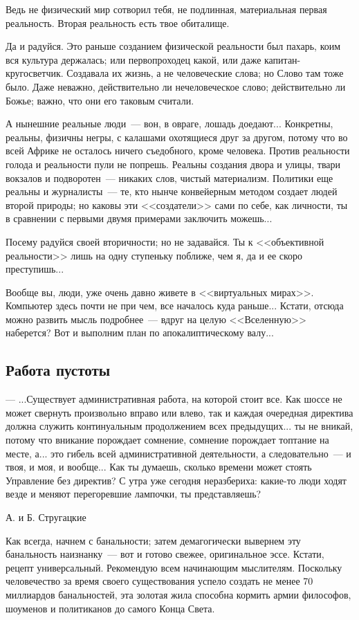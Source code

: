 \documentclass{scrbook}
\makeatletter
\newcommand{\bigepigraphwidth}{0.8} %
\newcommand{\defaultepigraphwidth}{0.5} %
\newcommand{\flqq}{<<}
\newcommand{\frqq}{>>}
\newcommand{\mdash}{~--- }
\newcommand{\sdash}{--- } %
\newcommand{\essaysection}[1]{\subsection*{#1}\nopagebreak}
\newcommand{\myepigraph}[3][\@empty]{
	\ifx\@empty#1
		\setlength{\epigraphwidth}{\defaultepigraphwidth\textwidth}
	\else
		\setlength{\epigraphwidth}{#1\textwidth}
	\fi
	\epigraph{#2}{#3}
	\setlength{\epigraphwidth}{\defaultepigraphwidth\textwidth} %
	\nopagebreak
}
\makeatother
\begin{document}
Ведь не физический мир сотворил тебя, не подлинная, материальная первая реальность. Вторая реальность есть твое обиталище.

Да и радуйся. Это раньше созданием физической реальности был пахарь, коим вся культура держалась; или первопроходец какой, или даже капитан-кругосветчик. Создавала их жизнь, а не человеческие слова; но Слово там тоже было. Даже неважно, действительно ли нечеловеческое слово; действительно ли Божье; важно, что они его таковым считали.

А нынешние реальные люди{\mdash}вон, в овраге, лошадь доедают... Конкретны, реальны, физичны негры, с калашами охотящиеся друг за другом, потому что во всей Африке не осталось ничего съедобного, кроме человека. Против реальности голода и реальности пули не попрешь. Реальны создания двора и улицы, твари вокзалов и подворотен{\mdash}никаких слов, чистый материализм. Политики еще реальны и журналисты{\mdash}те, кто нынче конвейерным методом создает людей второй природы; но каковы эти {\flqq}создатели{\frqq} сами по себе, как личности, ты в сравнении с первыми двумя примерами заключить можешь...

Посему радуйся своей вторичности; но не задавайся. Ты к {\flqq}объективной реальности{\frqq} лишь на одну ступеньку поближе, чем я, да и ее скоро преступишь...

Вообще вы, люди, уже очень давно живете в {\flqq}виртуальных мирах{\frqq}. Компьютер здесь почти не при чем, все началось куда раньше... Кстати, отсюда можно развить мысль подробнее{\mdash}вдруг на целую {\flqq}Вселенную{\frqq} наберется? Вот и выполним план по апокалиптическому валу...

\essaysection{Работа пустоты}

\myepigraph[\bigepigraphwidth]{{\sdash} ...Существует административная работа, на которой стоит все. Как шоссе не может свернуть произвольно вправо или влево, так и каждая очередная директива должна служить континуальным продолжением всех предыдущих... ты не вникай, потому что вникание порождает сомнение, сомнение порождает топтание на месте, а... это гибель всей административной деятельности, а следовательно{\mdash}и твоя, и моя, и вообще... Как ты думаешь, сколько времени может стоять Управление без директив? С утра уже сегодня неразбериха: какие-то люди ходят везде и меняют перегоревшие лампочки, ты представляешь?}
{А. и Б. Стругацкие}

Как всегда, начнем с банальности; затем демагогически вывернем эту банальность наизнанку{\mdash}вот и готово свежее, оригинальное эссе. Кстати, рецепт универсальный. Рекомендую всем начинающим мыслителям. Поскольку человечество за время своего существования успело создать не менее 70 миллиардов банальностей, эта золотая жила способна кормить армии философов, шоуменов и политиканов до самого Конца Света.
\end{document}
